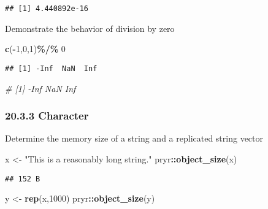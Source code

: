 \documentclass[
]{article}
\newenvironment{Shaded}{\begin{snugshade}}{\end{snugshade}}
\newcommand{\CommentTok}[1]{\textcolor[rgb]{0.56,0.35,0.01}{\textit{#1}}}
\newcommand{\DecValTok}[1]{\textcolor[rgb]{0.00,0.00,0.81}{#1}}
\newcommand{\FunctionTok}[1]{\textcolor[rgb]{0.13,0.29,0.53}{\textbf{#1}}}
\newcommand{\NormalTok}[1]{#1}
\newcommand{\OtherTok}[1]{\textcolor[rgb]{0.56,0.35,0.01}{#1}}
\newcommand{\SpecialCharTok}[1]{\textcolor[rgb]{0.81,0.36,0.00}{\textbf{#1}}}
\newcommand{\StringTok}[1]{\textcolor[rgb]{0.31,0.60,0.02}{#1}}
\begin{document}
\begin{verbatim}
## [1] 4.440892e-16
\end{verbatim}

Demonstrate the behavior of division by zero

\begin{Shaded}
\begin{Highlighting}[]
\FunctionTok{c}\NormalTok{(}\SpecialCharTok{{-}}\DecValTok{1}\NormalTok{,}\DecValTok{0}\NormalTok{,}\DecValTok{1}\NormalTok{)}\SpecialCharTok{\%/\%} \DecValTok{0}
\end{Highlighting}
\end{Shaded}

\begin{verbatim}
## [1] -Inf  NaN  Inf
\end{verbatim}

\begin{Shaded}
\begin{Highlighting}[]
\CommentTok{\# [1] {-}Inf  NaN  Inf}
\end{Highlighting}
\end{Shaded}

\hypertarget{character}{%
\subsubsection{20.3.3 Character}\label{character}}

Determine the memory size of a string and a replicated string vector

\begin{Shaded}
\begin{Highlighting}[]
\NormalTok{x }\OtherTok{\textless{}{-}} \StringTok{"This is a reasonably long string."}
\NormalTok{pryr}\SpecialCharTok{::}\FunctionTok{object\_size}\NormalTok{(x)}
\end{Highlighting}
\end{Shaded}

\begin{verbatim}
## 152 B
\end{verbatim}

\begin{Shaded}
\begin{Highlighting}[]
\NormalTok{y }\OtherTok{\textless{}{-}} \FunctionTok{rep}\NormalTok{(x,}\DecValTok{1000}\NormalTok{)}
\NormalTok{pryr}\SpecialCharTok{::}\FunctionTok{object\_size}\NormalTok{(y)}
\end{Highlighting}
\end{Shaded}
\end{document}
